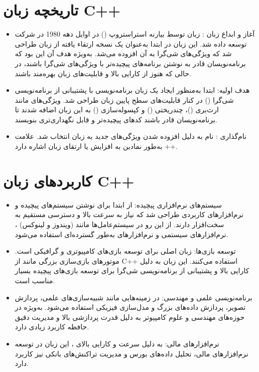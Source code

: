 \documentclass[12pt, a4paper]{report}
\begin{document}
\section{تاریخچه زبان C++}
\begin{itemize}
	\item
آغاز و ابداع زبان : 
زبان  توسط بیارنه استراستروپ  () در اوایل دهه 1980 در  شرکت توسعه داده شد.
 این زبان در ابتدا به‌عنوان یک نسخه ارتقاء یافته از زبان   طراحی شد که ویژگی‌های شی‌گرا به آن افزوده می‌شد.
 به‌ویژه هدف آن این بود که برنامه‌نویسان قادر به نوشتن برنامه‌های پیچیده‌تر با ویژگی‌های شی‌گرا باشند، در حالی که هنوز از کارایی بالا و قابلیت‌های زبان  بهره‌مند باشند.
	
	\item
هدف اولیه:   ابتدا به‌منظور ایجاد یک زبان برنامه‌نویسی با پشتیبانی از برنامه‌نویسی شی‌گرا () در کنار قابلیت‌های سطح پایین زبان  طراحی شد. ویژگی‌های  مانند ارث‌بری ()، چندریختی ()  و کپسوله‌سازی () به این زبان اضافه شدند تا برنامه‌نویسان قادر باشند کدهای پیچیده‌تر و قابل نگهداری‌تری بنویسند.
	
	\item
نام‌گذاری : نام  به دلیل افزوده شدن ویژگی‌های جدید به زبان  انتخاب شد. علامت ++ به‌طور نمادین به افزایش یا ارتقای زبان  اشاره دارد.
	
\end{itemize}

\section{کاربردهای زبان C++}
\begin{itemize}
		\item
سیستم‌های نرم‌افزاری پیچیده:  از ابتدا برای نوشتن سیستم‌های پیچیده و نرم‌افزارهای کاربردی طراحی شد که نیاز به سرعت بالا و دسترسی مستقیم به سخت‌افزار دارند. از این رو در سیستم‌عامل‌ها مانند (ویندوز و لینوکس) ، نرم‌افزارهای سیستمی و نرم‌افزارهای  به‌طور گسترده‌ای استفاده می‌شود.
	\item
توسعه بازی‌ها:  زبان اصلی برای توسعه بازی‌های کامپیوتری و گرافیکی است. موتورهای بازی‌سازی بزرگی مانند از C++ استفاده می‌کنند. این زبان به دلیل کارایی بالا و پشتیبانی از برنامه‌نویسی شی‌گرا برای توسعه بازی‌های پیچیده بسیار مناسب است.
	\item
برنامه‌نویسی علمی و مهندسی:  در زمینه‌هایی مانند شبیه‌سازی‌های علمی، پردازش تصویر، پردازش داده‌های بزرگ و مدل‌سازی فیزیکی استفاده می‌شود. به‌ویژه در حوزه‌های مهندسی و علوم کامپیوتر به دلیل قدرت پردازشی بالا و مدیریت دقیق حافظه کاربرد زیادی دارد.
	\item
نرم‌افزارهای مالی: به دلیل سرعت و کارایی بالای ، این زبان در توسعه نرم‌افزارهای مالی، تحلیل داده‌های بورس و مدیریت تراکنش‌های بانکی نیز کاربرد دارد.
\end{itemize}
\end{document}
